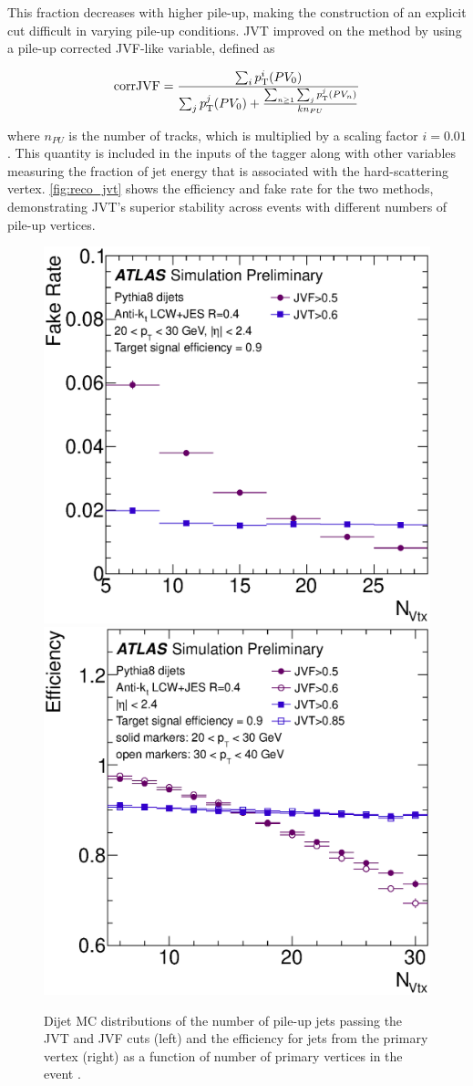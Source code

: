 This fraction decreases with higher pile-up, making the construction of an explicit cut difficult in varying pile-up conditions. \ac{JVT} improved on the method by using a pile-up corrected \ac{JVF}-like variable, defined as 

\begin{equation}
\mathrm{corrJVF} = \frac{\sum_i p_{\text{T}}^i(PV_0)}{\sum_j p_{\text{T}}^j(PV_0) + \frac{\sum_{n\geq1} \sum_j p_{\text{T}}^j(PV_n)}{kn_{PU}}} 
\end{equation}

where $n_{PU}$ is the number of tracks, which is multiplied by a scaling factor $i = 0.01$. This quantity is included in the inputs of the tagger along with other variables measuring the fraction of jet energy that is associated with the hard-scattering vertex. \autoref{fig:reco_jvt} shows the efficiency and fake rate for the two methods, demonstrating \ac{JVT}'s superior stability across events with different numbers of pile-up vertices. 

\begin{centering}
\begin{figure}[!hbt]
\myfloatalign
\includegraphics[width=.48\linewidth]{figures/reco/jvt_fig_06b.eps}
\includegraphics[width=.48\linewidth]{figures/reco/jvt_fig_07a.eps}
\caption{ Dijet \ac{MC} distributions of the number of pile-up jets passing the \ac{JVT} and \ac{JVF} cuts (left) and the efficiency for jets from the primary vertex (right) as a function of number of primary vertices in the event \cite{ATLAS-CONF-2014-018}. }
\label{fig:reco_jvt}
\end{figure}
\end{centering}

